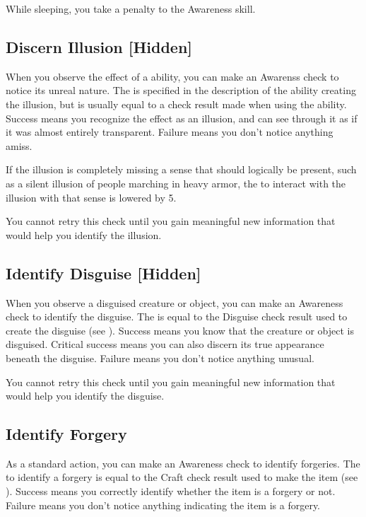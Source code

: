     While sleeping, you take a  penalty to the Awareness skill.

    \subsection{Discern Illusion [Hidden]}
        When you observe the effect of a  ability, you can make an Awarenss check to notice its unreal nature.
        The  is specified in the description of the ability creating the illusion, but is usually equal to a check result made when using the ability.
        Success means you recognize the effect as an illusion, and can see through it as if it was almost entirely transparent.
        Failure means you don't notice anything amiss.

        If the illusion is completely missing a sense that should logically be present, such as a silent illusion of people marching in heavy armor, the  to interact with the illusion with that sense is lowered by 5.

        You cannot retry this check until you gain meaningful new information that would help you identify the illusion.

    \subsection{Identify Disguise [Hidden]}\label{Identify Disguise}
        When you observe a disguised creature or object, you can make an Awareness check to identify the disguise.
        The  is equal to the Disguise check result used to create the disguise (see ).
        Success means you know that the creature or object is disguised.
        Critical success means you can also discern its true appearance beneath the disguise.
        Failure means you don't notice anything unusual.

        You cannot retry this check until you gain meaningful new information that would help you identify the disguise.

    \subsection{Identify Forgery}
        As a standard action, you can make an Awareness check to identify forgeries.
        The  to identify a forgery is equal to the Craft check result used to make the item (see ).
        Success means you correctly identify whether the item is a forgery or not.
        Failure means you don't notice anything indicating the item is a forgery.

